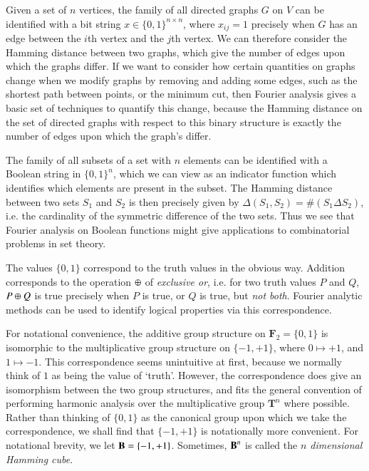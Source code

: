 \begin{example}
    Given a set of $n$ vertices, the family of all directed graphs $G$ on $V$ can be identified with a bit string $x \in \{ 0, 1 \}^{n \times n}$, where $x_{ij} = 1$ precisely when $G$ has an edge between the $i$th vertex and the $j$th vertex. We can therefore consider the Hamming distance between two graphs, which give the number of edges upon which the graphs differ. If we want to consider how certain quantities on graphs change when we modify graphs by removing and adding some edges, such as the shortest path between points, or the minimum cut, then Fourier analysis gives a basic set of techniques to quantify this change, because the Hamming distance on the set of directed graphs with respect to this binary structure is exactly the number of edges upon which the graph's differ.
\end{example}

\begin{example}
    The family of all subsets of a set with $n$ elements can be identified with a Boolean string in $\{ 0, 1 \}^n$, which we can view as an indicator function which identifies which elements are present in the subset. The Hamming distance between two sets $S_1$ and $S_2$ is then precisely given by $\Delta(S_1,S_2) = \#(S_1 \Delta S_2)$, i.e. the cardinality of the symmetric difference of the two sets. Thus we see that Fourier analysis on Boolean functions might give applications to combinatorial problems in set theory.
\end{example}

\begin{example}
    The values $\{ 0, 1 \}$ correspond to the truth values in the obvious way. Addition corresponds to the operation $\oplus$ of \emph{exclusive or}, i.e. for two truth values $P$ and $Q$, $P \oplus Q$ is true precisely when $P$ is true, or $Q$ is true, but \emph{not both}. Fourier analytic methods can be used to identify logical properties via this correspondence.
\end{example}

For notational convenience, the additive group structure on $\mathbf{F}_2 = \{ 0, 1 \}$ is isomorphic to the multiplicative group structure on $\{ -1, +1 \}$, where $0 \mapsto +1$, and $1 \mapsto -1$. This correspondence seems unintuitive at first, because  we normally think of $1$ as being the value of `truth'. However, the correspondence does give an isomorphism between the two group structures, and fits the general convention of performing harmonic analysis over the multiplicative group $\mathbf{T}^n$ where possible. Rather than thinking of $\{ 0, 1 \}$ as the canonical group upon which we take the correspondence, we shall find that $\{ -1, +1 \}$ is notationally more convenient. For notational brevity, we let $\operatorname{\mathbf{B}} = \{ -1, +1 \}$. Sometimes, $\operatorname{\mathbf{B}}^n$ is called the \emph{$n$ dimensional Hamming cube}.

